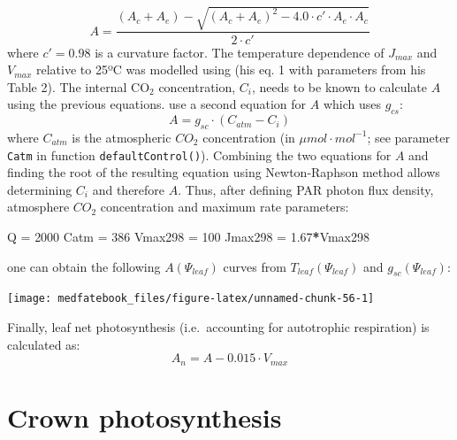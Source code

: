 \documentclass[]{book}
\newenvironment{Shaded}{\begin{snugshade}}{\end{snugshade}}
\newcommand{\DecValTok}[1]{\textcolor[rgb]{0.00,0.00,0.81}{#1}}
\newcommand{\FloatTok}[1]{\textcolor[rgb]{0.00,0.00,0.81}{#1}}
\newcommand{\StringTok}[1]{\textcolor[rgb]{0.31,0.60,0.02}{#1}}
\newcommand{\OperatorTok}[1]{\textcolor[rgb]{0.81,0.36,0.00}{\textbf{#1}}}
\newcommand{\NormalTok}[1]{#1}
\begin{document}
\begin{equation}
A = \frac{(A_c+A_e)-\sqrt{(A_c+A_e)^2-4.0\cdot c'\cdot A_e\cdot A_c}}{2\cdot c'}
\end{equation}
where \(c'=0.98\) is a curvature factor. The temperature dependence of \(J_{max}\) and \(V_{max}\) relative to 25ºC was modelled using \citet{Leuning2002} (his eq. 1 with parameters from his Table 2). The internal CO\(_2\) concentration, \(C_i\), needs to be known to calculate \(A\) using the previous equations. \citet{Sperry2016a} use a second equation for \(A\) which uses \(g_{cs}\):
\begin{equation}
A = g_{sc} \cdot (C_{atm}-C_i)
\end{equation}
where \(C_{atm}\) is the atmospheric \(CO_{2}\) concentration (in \(\mu mol \cdot mol^{-1}\); see parameter \texttt{Catm} in function \texttt{defaultControl()}). Combining the two equations for \(A\) and finding the root of the resulting equation using Newton-Raphson method allows determining \(C_i\) and therefore \(A\). Thus, after defining PAR photon flux density, atmosphere \(CO_{2}\) concentration and maximum rate parameters:

\begin{Shaded}
\begin{Highlighting}[]
\NormalTok{Q =}\StringTok{ }\DecValTok{2000}
\NormalTok{Catm =}\StringTok{ }\DecValTok{386}
\NormalTok{Vmax298 =}\StringTok{ }\DecValTok{100}
\NormalTok{Jmax298 =}\StringTok{ }\FloatTok{1.67}\OperatorTok{*}\NormalTok{Vmax298}
\end{Highlighting}
\end{Shaded}

one can obtain the following \(A(\Psi_{leaf})\) curves from \(T_{leaf}(\Psi_{leaf})\) and \(g_{sc}(\Psi_{leaf})\):

\begin{center}\texttt{[image: medfatebook\_files/figure-latex/unnamed-chunk-56-1]} \end{center}

Finally, leaf net photosynthesis (i.e.~accounting for autotrophic respiration) is calculated as:
\begin{equation}
A_n = A - 0.015 \cdot V_{max}
\end{equation}

\hypertarget{crown-photosynthesis}{%
\section{Crown photosynthesis}\label{crown-photosynthesis}}
\end{document}
